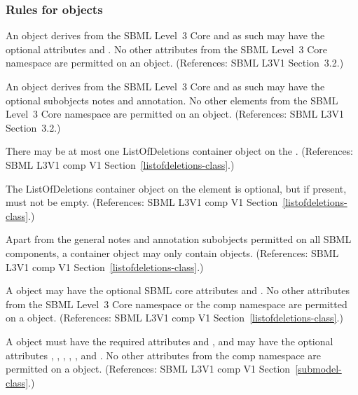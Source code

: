 \begin{sbmlenum}


\end{sbmlenum} \subsubsection*{Rules for  objects} \begin{sbmlenum}

 { An \Submodel object derives from the SBML
  Level~3 Core  and as such may have the optional attributes
   and . No other attributes from the SBML
  Level~3 Core namespace are permitted on an \Submodel object.
  (References: SBML L3V1 Section~3.2.) }
   

 { An \Submodel object derives from the SBML
  Level~3 Core  and as such may have the optional subobjects
  notes and annotation. No other elements from the SBML
  Level~3 Core namespace are permitted on an \Submodel object.
  (References: SBML L3V1 Section~3.2.) }
   

 { There may be at most one ListOfDeletions container
  object on the \Submodel. 
  (References: SBML L3V1 comp V1 Section~\ref{listofdeletions-class}.) }


 { The ListOfDeletions container object on 
  the \Submodel element is optional, but if present, must not be empty. 
  (References: SBML L3V1 comp V1 Section~\ref{listofdeletions-class}.) }
  

 { Apart from the general notes and annotation
  subobjects permitted on all SBML components, a \ListOfDeletions
  container object may only contain \Deletion objects.
  (References: SBML L3V1 comp V1 Section~\ref{listofdeletions-class}.) }


 { A \ListOfDeletions object may have the optional 
  SBML core attributes  and .  No other attributes 
  from the SBML Level~3 Core namespace or the comp namespace are permitted on 
  a \ListOfDeletions object.
  (References: SBML L3V1 comp V1 Section~\ref{listofdeletions-class}.) }


 { A \Submodel object must have the
  required attributes  and , and may have
  the optional attributes ,
  , ,
  , , and
  .
  No other attributes from the comp namespace are permitted on a
  \Submodel object.
  (References: SBML L3V1 comp V1 Section~\ref{submodel-class}.) }



\end{sbmlenum}
